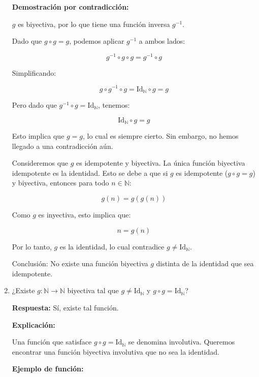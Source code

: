 \begin{solution}
\begin{enumerate}
      \textbf{Demostración por contradicción:}
      
      \( g \) es biyectiva, por lo que tiene una función inversa \( g^{-1} \).
      
      Dado que \( g \circ g = g \), podemos aplicar \( g^{-1} \) a ambos lados:
      
        \[
        g^{-1} \circ g \circ g = g^{-1} \circ g
        \]
      
      Simplificando:
      
        \[
        g \circ g^{-1} \circ g = \text{Id}_{\mathbb{N}} \circ g = g
        \]
      
      Pero dado que \( g^{-1} \circ g = \text{Id}_{\mathbb{N}} \), tenemos:
      
        \[
        \text{Id}_{\mathbb{N}} \circ g = g
        \]
      
      Esto implica que \( g = g \), lo cual es siempre cierto. Sin embargo, no hemos llegado a una contradicción aún.
      
      Consideremos que \( g \) es idempotente y biyectiva. La única función biyectiva idempotente es la identidad. Esto se debe a que si \( g \) es idempotente (\( g \circ g = g \)) y biyectiva, entonces para todo \( n \in \mathbb{N} \):
      
        \[
        g(n) = g(g(n))
        \]
      
      Como \( g \) es inyectiva, esto implica que:
      
        \[
        n = g(n)
        \]
      
      Por lo tanto, \( g \) es la identidad, lo cual contradice \( g \neq \text{Id}_{\mathbb{N}} \).
      
      Conclusión: No existe una función biyectiva \( g \) distinta de la identidad que sea idempotente.
      
      \item ¿Existe \( g : \mathbb{N} \rightarrow \mathbb{N} \) biyectiva tal que \( g \neq \text{Id}_{\mathbb{N}} \) y \( g \circ g = \text{Id}_{\mathbb{N}} \)?
      
      \textbf{Respuesta:} Sí, existe tal función.
      
      \textbf{Explicación:}
      
      Una función que satisface \( g \circ g = \text{Id}_{\mathbb{N}} \) se denomina involutiva. Queremos encontrar una función biyectiva involutiva que no sea la identidad.
      
      \textbf{Ejemplo de función:}
      

\end{enumerate}
\end{solution}
